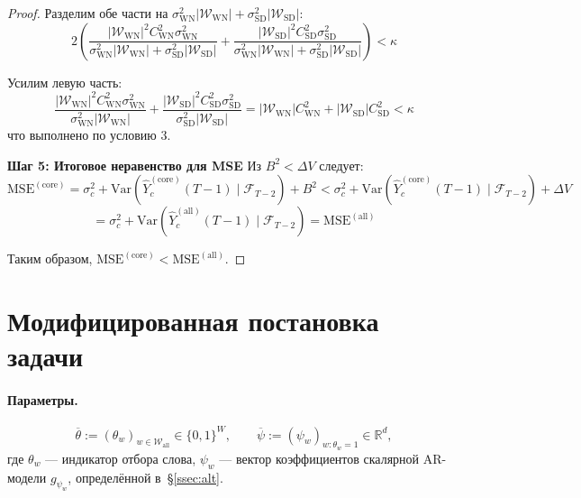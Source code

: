 \documentclass[14pt,a4paper]{article}
\begin{document}
\begin{proof}
Разделим обе части на $\sigma_{\mathrm{WN}}^2 |\mathcal{W}_{\mathrm{WN}}| + \sigma_{\mathrm{SD}}^2 |\mathcal{W}_{\mathrm{SD}}|$:
\[
2 \left( \frac{|\mathcal{W}_{\mathrm{WN}}|^2 C_{\mathrm{WN}}^2 \sigma_{\mathrm{WN}}^2}{\sigma_{\mathrm{WN}}^2 |\mathcal{W}_{\mathrm{WN}}| + \sigma_{\mathrm{SD}}^2 |\mathcal{W}_{\mathrm{SD}}|} + \frac{|\mathcal{W}_{\mathrm{SD}}|^2 C_{\mathrm{SD}}^2 \sigma_{\mathrm{SD}}^2}{\sigma_{\mathrm{WN}}^2 |\mathcal{W}_{\mathrm{WN}}| + \sigma_{\mathrm{SD}}^2 |\mathcal{W}_{\mathrm{SD}}|} \right) < \kappa
\]

Усилим левую часть:
\[
\frac{|\mathcal{W}_{\mathrm{WN}}|^2 C_{\mathrm{WN}}^2 \sigma_{\mathrm{WN}}^2}{\sigma_{\mathrm{WN}}^2 |\mathcal{W}_{\mathrm{WN}}|} + \frac{|\mathcal{W}_{\mathrm{SD}}|^2 C_{\mathrm{SD}}^2 \sigma_{\mathrm{SD}}^2}{\sigma_{\mathrm{SD}}^2 |\mathcal{W}_{\mathrm{SD}}|} = |\mathcal{W}_{\mathrm{WN}}| C_{\mathrm{WN}}^2 + |\mathcal{W}_{\mathrm{SD}}| C_{\mathrm{SD}}^2 < \kappa
\]
что выполнено по условию 3.

\textbf{Шаг 5: Итоговое неравенство для MSE}
Из $B^2 < \Delta V$ следует:
\[
\mathrm{MSE}^{(\mathrm{core})} = \sigma_c^2 + \mathrm{Var}\left( \widehat{Y}_c^{(\mathrm{core})}(T-1) \mid \mathcal{F}_{T-2} \right) + B^2 < \sigma_c^2 + \mathrm{Var}\left( \widehat{Y}_c^{(\mathrm{core})}(T-1) \mid \mathcal{F}_{T-2} \right) + \Delta V
\]
\[
= \sigma_c^2 + \mathrm{Var}\left( \widehat{Y}_c^{(\mathrm{all})}(T-1) \mid \mathcal{F}_{T-2} \right) = \mathrm{MSE}^{(\mathrm{all})}
\]

Таким образом, $\mathrm{MSE}^{(\mathrm{core})} < \mathrm{MSE}^{(\mathrm{all})}$.
\end{proof}


\newpage
\section{Модифицированная постановка задачи}
\label{ssec:modform}

\paragraph{Параметры.}
\[
  \overline{\theta}:=(\theta_w)_{w\in\mathcal W_{\mathrm{all}}}\in\{0,1\}^{W},
  \qquad
  \overline{\psi}:=(\psi_w)_{w:\theta_w=1}\in\mathbb R^{d},
\]
где $\theta_w$ — индикатор отбора слова,  
$\psi_w$ — вектор коэффициентов скалярной AR-модели $g_{\psi_w}$, определённой в~\S\ref{ssec:alt}.
\end{document}
